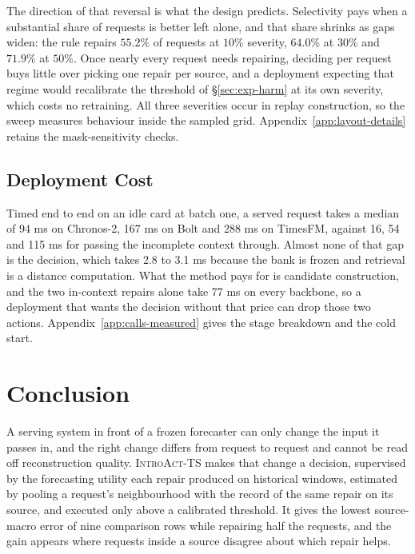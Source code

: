 \documentclass{article}
\newcommand{\introact}{\textsc{IntroAct-TS}}
\begin{document}
The direction of that reversal is what the design predicts. Selectivity pays when a
substantial share of requests is better left alone, and that share shrinks as gaps widen: the
rule repairs $55.2\%$ of requests at $10\%$ severity, $64.0\%$ at $30\%$ and $71.9\%$ at
$50\%$. Once nearly every request needs repairing, deciding per request buys little over
picking one repair per source, and a deployment expecting that regime would recalibrate the
threshold of \S\ref{sec:exp-harm} at its own severity, which costs no retraining. All three
severities occur in replay construction, so the sweep measures behaviour inside the sampled
grid. Appendix~\ref{app:layout-details} retains the mask-sensitivity checks.



\subsection{Deployment Cost}
\label{sec:exp-cost}
Timed end to end on an idle card at batch one, a served request takes a median of 94 ms on
Chronos-2, 167 ms on Bolt and 288 ms on TimesFM, against 16, 54 and 115 ms for passing the
incomplete context through. Almost none of that gap is the decision, which takes 2.8 to
3.1 ms because the bank is frozen and retrieval is a distance computation. What the method
pays for is candidate construction, and the two in-context repairs alone take 77 ms on every
backbone, so a deployment that wants the decision without that price can drop those two
actions. Appendix~\ref{app:calls-measured} gives the stage breakdown and the cold start.

\section{Conclusion}
\label{sec:conclusion}
A serving system in front of a frozen forecaster can only change the input it passes in, and
the right change differs from request to request and cannot be read off reconstruction
quality. \introact{} makes that change a decision, supervised by the forecasting utility each
repair produced on historical windows, estimated by pooling a request's neighbourhood with
the record of the same repair on its source, and executed only above a calibrated threshold.
It gives the lowest source-macro error of nine comparison rows while repairing half the
requests, and the gain appears where requests inside a source disagree about which repair
helps.

\label{sec:main-end}
\end{document}
